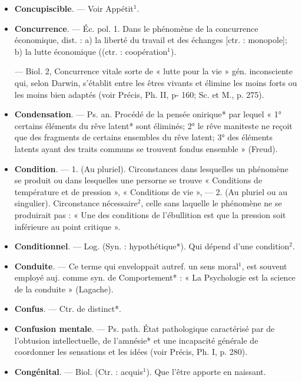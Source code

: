\begin{itemize}[leftmargin=1cm, label=, itemsep=11pt]
\item {\bf Concupiscible}. — Voir Appétit$^1$.

\item {\bf Concurrence}. — Éc. pol. 1. Dans le
phénomène de la concurrence économique, dist. : a) la liberté du travail
et des échanges [ctr. : monopole];
b) la lutte économique ((ctr. : coopération$^1$).

— Biol. 2, Concurrence vitale
sorte de « lutte pour la vie » gén.
inconsciente qui, selon Darwin,
s'établit entre les êtres vivants et
élimine les moins forts ou les moins
bien adaptés (voir Précis, Ph. II,
p- 160; Sc. et M., p. 275).

\item {\bf Condensation}. — Ps. an. Procédé de
la pensée onirique* par lequel
« 1° certains éléments du rêve latent*
sont éliminés; 2° le rêve maniteste
ne reçoit que des fragments de certains ensembles du rêve latent;
3° des éléments latents ayant des
traits communs se trouvent fondus
ensemble » (Freud).

\item {\bf Condition}. — 1. (Au pluriel). Circonstances dans lesquelles un phénomène se produit ou dans lesquelles une persorne se trouve
« Conditions de température et de
pression », « Conditions de vie », —
2. (Au pluriel ou au singulier). Circonstance nécessaire$^2$, celle sans
laquelle le phénomène ne se produirait
pas : « Une des conditions de
l'ébullition est que la pression soit
inférieure au point critique ».

\item {\bf Conditionnel}. — Log. (Syn. : hypothétique*). Qui dépend d'une condition$^2$.

\item {\bf Conduite}. — Ce terme qui enveloppait
autref. un sens moral$^1$, est souvent
employé auj. comme syn. de Comportement* : « La Psychologie est la
science de la conduite » (Lagache).

\item {\bf Confus}. — Ctr. de distinct*.

\item {\bf Confusion mentale}. — Ps. path. État
pathologique caractérisé par de
l’obtusion intellectuelle, de l’amnésie* et une incapacité générale de
coordonner les sensations et les
idées (voir Précis, Ph. I, p. 280).

\item {\bf Congénital}. — Biol. (Ctr. : acquis$^1$).
Que l’être apporte en naissant.


\end{itemize}
